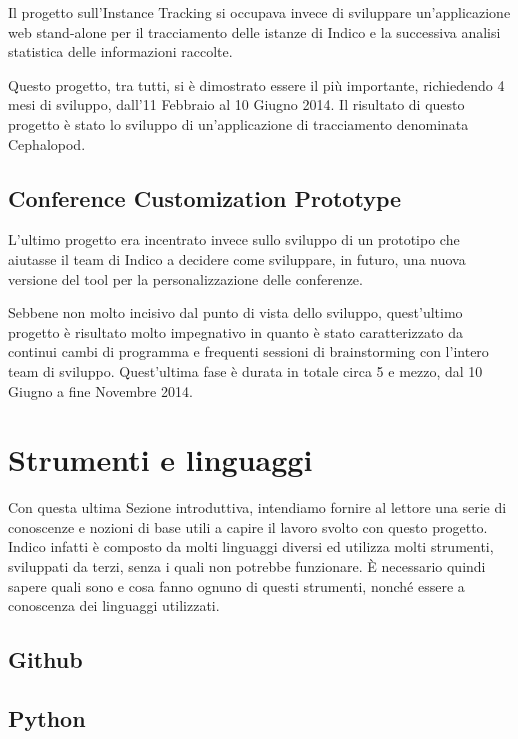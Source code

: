         	Il progetto sull'Instance Tracking si occupava invece di sviluppare un'applicazione web stand-alone per il tracciamento delle istanze di Indico e la successiva analisi statistica delle informazioni raccolte.
        	
        	Questo progetto, tra tutti, si è dimostrato essere il più importante, richiedendo 4 mesi di sviluppo, dall'11 Febbraio al 10 Giugno 2014. Il risultato di questo progetto è stato lo sviluppo di un'applicazione di tracciamento denominata Cephalopod.
    	
    	\subsection{Conference Customization Prototype} \label{subsec:p;pp;conference_customization_prototype}
    	
        	L'ultimo progetto era incentrato invece sullo sviluppo di un prototipo che aiutasse il team di Indico a decidere come sviluppare, in futuro, una nuova versione del tool per la personalizzazione delle conferenze.
        	
        	Sebbene non molto incisivo dal punto di vista dello sviluppo, quest'ultimo progetto è risultato molto impegnativo in quanto è stato caratterizzato da continui cambi di programma e frequenti sessioni di brainstorming con l'intero team di sviluppo. Quest'ultima fase è durata in totale circa 5 e mezzo, dal 10 Giugno a fine Novembre 2014.
    	
    \section{Strumenti e linguaggi} \label{sec:p;strumenti_linguaggi}
    
        Con questa ultima Sezione introduttiva, intendiamo fornire al lettore una serie di conoscenze e nozioni di base utili a capire il lavoro svolto con questo progetto. Indico infatti è composto da molti linguaggi diversi ed utilizza molti strumenti, sviluppati da terzi, senza i quali non potrebbe funzionare. È necessario quindi sapere quali sono e cosa fanno ognuno di questi strumenti, nonché essere a conoscenza dei linguaggi utilizzati.
        
        \subsection{Github} \label{subsec:p;sl;github}
    
        \subsection{Python} \label{subsec:p;sl;python}
        
